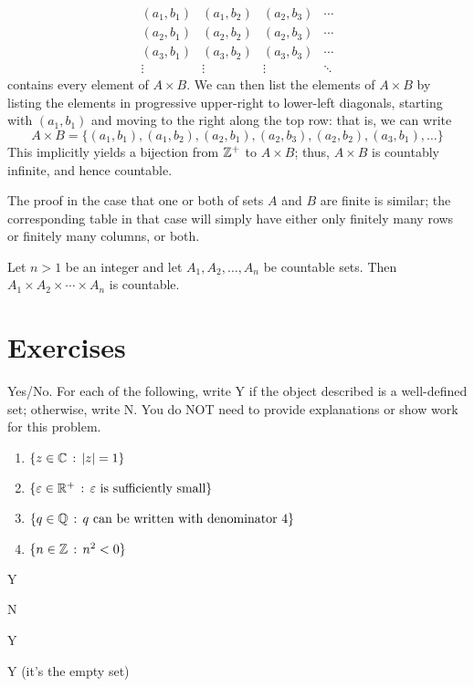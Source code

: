 $$
    \begin{array}{cccc}
      (a_1,b_1) & (a_1,b_2) & (a_2,b_3) & \cdots \\
      (a_2,b_1) & (a_2,b_2) & (a_2,b_3) & \cdots \\
      (a_3,b_1) & (a_3,b_2) & (a_3,b_3) & \cdots\\
      \vdots & \vdots & \vdots &  \ddots
    \end{array}$$ contains every element of $A\times B$. We can then list the elements of $A\times B$ by listing the elements in progressive upper-right to lower-left diagonals, starting with $(a_1,b_1)$ and moving to the right along the top row: that is, we can write
   $$A\times B=\{(a_1,b_1),(a_1,b_2),(a_2,b_1),(a_2,b_3),(a_2,b_2),(a_3,b_1),\ldots\}$$
    This implicitly yields a bijection from $\mathbb{Z}^+$ to $A\times B$; thus, $A\times B$ is countably infinite, and hence countable.

    The proof in the case that one or both of sets $A$ and $B$ are finite is similar; the corresponding table in that case will simply have either only finitely many rows or finitely many columns, or both.

\begin{cor} Let $n>1$ be an integer and let $A_1,A_2,\ldots, A_n$ be countable sets.  Then $A_1\times A_2\times \cdots \times A_n$ is countable.
\end{cor}


\pagebreak

\section{Exercises}

\begin{exercise}[ID=1A]

Yes/No. For each of the following, write Y if the object described is a well-defined set; otherwise, write N. You do NOT need to provide explanations or show work for this problem.

\begin{enumerate}

\item $\{z \in \mathbb{C} \,:\, |z|=1\}$

\item $\{\varepsilon \in \mathbb{R}^+\,:\, \varepsilon \mbox{ is sufficiently small}\}$

\item $\{q\in \mathbb{Q} \,:\, q \mbox{ can be written  with denominator }4\}$

\item $\{n \in \mathbb{Z}\,:\, n^2 <0\}$

\end{enumerate}

\end{exercise}
\begin{solution}[print=true]
\begin{inparaenum}[(a)]
\item Y \hfill \item N \hfill \item  Y \hfill \item Y (it's the empty set)
\end{inparaenum}
\end{solution}

